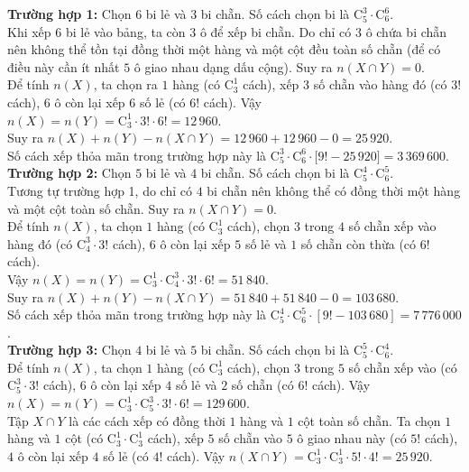 \begin{ex}
{		\textbf{Trường hợp 1:} Chọn $6$ bi lẻ và $3$ bi chẵn. Số cách chọn bi là $\mathrm{C}_5^3 \cdot \mathrm{C}_6^6$.\\
		Khi xếp $6$ bi lẻ vào bảng, ta còn $3$ ô để xếp bi chẵn. Do chỉ có $3$ ô chứa bi chẵn nên không thể tồn tại đồng thời một hàng và một cột đều toàn số chẵn (để có điều này cần ít nhất $5$ ô giao nhau dạng dấu cộng). Suy ra $n(X \cap Y) = 0$.\\
		Để tính $n(X)$, ta chọn ra $1$ hàng (có $\mathrm{C}_3^1$ cách), xếp $3$ số chẵn vào hàng đó (có $3!$ cách), $6$ ô còn lại xếp $6$ số lẻ (có $6!$ cách). Vậy $n(X) = n(Y) = \mathrm{C}_3^1 \cdot 3! \cdot 6! = 12\,960$.\\
		Suy ra $n(X) + n(Y) - n(X \cap Y) = 12\,960 + 12\,960 - 0 = 25\,920$.\\
		Số cách xếp thỏa mãn trong trường hợp này là $\mathrm{C}_5^3 \cdot \mathrm{C}_6^6 \cdot \big[ 9! - 25\,920 \big] = 3\,369\,600$.\\
		\textbf{Trường hợp 2:} Chọn $5$ bi lẻ và $4$ bi chẵn. Số cách chọn bi là $\mathrm{C}_5^4 \cdot \mathrm{C}_6^5$.\\
		Tương tự trường hợp 1, do chỉ có $4$ bi chẵn nên không thể có đồng thời một hàng và một cột toàn số chẵn. Suy ra $n(X \cap Y) = 0$.\\
		Để tính $n(X)$, ta chọn $1$ hàng (có $\mathrm{C}_3^1$ cách), chọn $3$ trong $4$ số chẵn xếp vào hàng đó (có $\mathrm{C}_4^3 \cdot 3!$ cách), $6$ ô còn lại xếp $5$ số lẻ và $1$ số chẵn còn thừa (có $6!$ cách).\\ Vậy $n(X) = n(Y) = \mathrm{C}_3^1 \cdot \mathrm{C}_4^3 \cdot 3! \cdot 6! = 51\,840$.\\
		Suy ra $n(X) + n(Y) - n(X \cap Y) = 51\,840 + 51\,840 - 0 = 103\,680$.\\
		Số cách xếp thỏa mãn trong trường hợp này là $\mathrm{C}_5^4 \cdot \mathrm{C}_6^5 \cdot \left[ 9! - 103\,680 \right] = 7\,776\,000$.\\
		\textbf{Trường hợp 3:} Chọn $4$ bi lẻ và $5$ bi chẵn. Số cách chọn bi là $\mathrm{C}_5^5 \cdot \mathrm{C}_6^4$.\\
		Để tính $n(X)$, ta chọn $1$ hàng (có $\mathrm{C}_3^1$ cách), chọn $3$ trong $5$ số chẵn xếp vào (có $\mathrm{C}_5^3 \cdot 3!$ cách), $6$ ô còn lại xếp $4$ số lẻ và $2$ số chẵn (có $6!$ cách). Vậy $n(X) = n(Y) = \mathrm{C}_3^1 \cdot \mathrm{C}_5^3 \cdot 3! \cdot 6! = 129\,600$.\\
		Tập $X \cap Y$ là các cách xếp có đồng thời $1$ hàng và $1$ cột toàn số chẵn. Ta chọn $1$ hàng và $1$ cột (có $\mathrm{C}_3^1 \cdot \mathrm{C}_3^1$ cách), xếp $5$ số chẵn vào $5$ ô giao nhau này (có $5!$ cách), $4$ ô còn lại xếp $4$ số lẻ (có $4!$ cách). Vậy $n(X \cap Y) = \mathrm{C}_3^1 \cdot \mathrm{C}_3^1 \cdot 5! \cdot 4! = 25\,920$.\\
}
\end{ex}
